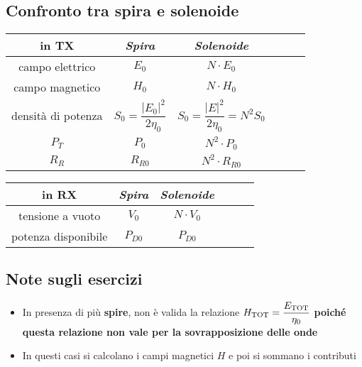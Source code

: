 \documentclass{article}
\begin{document}
\subsection{Confronto tra spira e solenoide}
\vspace{15pt}
\begin{center}
	\begin{tabular}{|Sc|Sc|Sc|}
		\hline
		\textbf{in TX}     & \textit{Spira}                      & \textit{Solenoide}                          \\
		\hline
		campo elettrico    & \(E_0\)                             & \(N \cdot E_0\)                             \\
		\hline
		campo magnetico    & \(H_0\)                             & \(N \cdot H_0\)                             \\
		\hline
		densità di potenza & \(S_0 = \dfrac{|E_0|^2}{2 \eta_0}\) & \(S_0 = \dfrac{|E|^2}{2 \eta_0} = N^2 S_0\) \\
		\hline
		\(P_T\)            & \(P_0\)                             & \(N^2 \cdot P_0\)                           \\
		\hline
		\(R_R\)            & \(R_{R0}\)                          & \(N^2 \cdot R_{R0}\)                        \\
		\hline
	\end{tabular}
\end{center}
\vspace{5pt}
\begin{center}
	\begin{tabular}{|Sc|Sc|Sc|}
		\hline
		\textbf{in RX}      & \textit{Spira} & \textit{Solenoide} \\
		\hline
		tensione a vuoto    & \(V_0\)        & \(N \cdot V_0\)    \\
		\hline
		potenza disponibile & \(P_{D0}\)     & \(P_{D0}\)         \\
		\hline
	\end{tabular}
\end{center}
\vspace{5pt}

\subsection{Note sugli esercizi}
\begin{itemize}
	\item In presenza di più \textbf{spire}, non è valida la relazione \( H_{\textnormal{TOT}} = \dfrac{E_{\textnormal{TOT}}}{\eta_0} \) \textbf{poiché questa relazione non vale per la sovrapposizione delle onde}
	\item In questi casi si calcolano i campi magnetici \(H\) e poi si sommano i contributi
\end{itemize}
\end{document}
